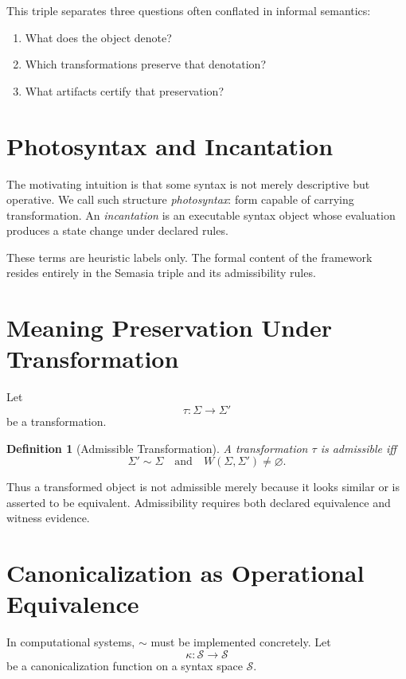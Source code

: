 \documentclass[11pt]{article}
\newtheorem{definition}{Definition}
\begin{document}
This triple separates three questions often conflated in informal semantics:
\begin{enumerate}[leftmargin=2em]
\item What does the object denote?
\item Which transformations preserve that denotation?
\item What artifacts certify that preservation?
\end{enumerate}

\section{Photosyntax and Incantation}

The motivating intuition is that some syntax is not merely descriptive but operative. We call such structure \emph{photosyntax}: form capable of carrying transformation. An \emph{incantation} is an executable syntax object whose evaluation produces a state change under declared rules.

These terms are heuristic labels only. The formal content of the framework resides entirely in the Semasia triple and its admissibility rules.

\section{Meaning Preservation Under Transformation}

Let
\[
\tau : \Sigma \to \Sigma'
\]
be a transformation.

\begin{definition}[Admissible Transformation]
A transformation $\tau$ is admissible iff
\[
\Sigma' \sim \Sigma
\quad\text{and}\quad
W(\Sigma,\Sigma') \neq \varnothing.
\]
\end{definition}

Thus a transformed object is not admissible merely because it looks similar or is asserted to be equivalent. Admissibility requires both declared equivalence and witness evidence.

\section{Canonicalization as Operational Equivalence}

In computational systems, $\sim$ must be implemented concretely. Let
\[
\kappa : \mathcal{S} \to \mathcal{S}
\]
be a canonicalization function on a syntax space $\mathcal{S}$.
\end{document}
